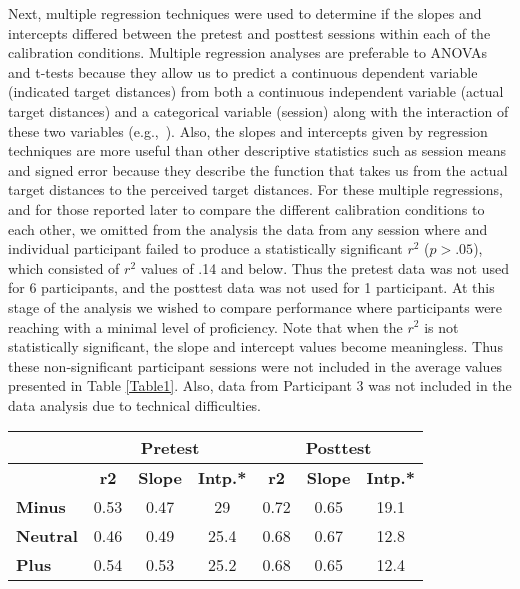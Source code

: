 Next, multiple regression techniques were used to determine if the slopes and intercepts differed between the pretest and posttest sessions within each of the calibration conditions. Multiple regression analyses are preferable to ANOVAs and t-tests because they allow us to predict a continuous dependent variable (indicated target distances) from both a continuous independent variable (actual target distances) and a categorical variable (session) along with the interaction of these two variables (e.g.,~\cite{BP98,PB98,PGJ01,PI08}). Also, the slopes and intercepts given by regression techniques are more useful than other descriptive statistics such as session means and signed error because they describe the function that takes us from the actual target distances to the perceived target distances. For these multiple regressions, and for those reported later to compare the different calibration conditions to each other, we omitted from the analysis the data from any session where and individual participant failed to produce a statistically significant $r^2$ ($p > .05$), which consisted of $r^2$ values of .14 and below. Thus the pretest data was not used for 6 participants, and the posttest data was not used for 1 participant. At this stage of the analysis we wished to compare performance where participants were reaching with a minimal level of proficiency. Note that when the $r^2$ is not statistically significant, the slope and intercept values become meaningless. Thus these non-significant participant sessions were not included in the average values presented in Table \ref{Table1}. Also, data from Participant 3 was not included in the data analysis due to technical difficulties.


\begin{table*}[h]
	\centering
	\caption{Average $R^2$, Slopes, and Intercepts of Simple Regressions Predicting Reach Distance from Actual Distance (cm) for Each Participant in the Minus, Neutral and Plus conditions (*Intercept)}\vspace{1em}\label{Table1}
	\begin{tabular}{|l|c|c|c|c|c|c|}
		\hline
		\multicolumn{1}{|l|}{} & \multicolumn{3}{c|}{\textbf{Pretest}}             & \multicolumn{3}{c|}{\textbf{Posttest}}            \\ \hline
		\multicolumn{1}{|l|}{} & \textbf{r2} & \textbf{Slope} & \textbf{Intp.*} & \textbf{r2} & \textbf{Slope} & \textbf{Intp.*} \\ \hline
		\textbf{Minus}         & 0.53        & 0.47           & 29                 & 0.72        & 0.65           & 19.1               \\ \hline
		\textbf{Neutral}       & 0.46        & 0.49           & 25.4               & 0.68        & 0.67           & 12.8               \\ \hline
		\textbf{Plus}          & 0.54        & 0.53           & 25.2               & 0.68        & 0.65           & 12.4               \\ \hline
	\end{tabular}
\end{table*}


